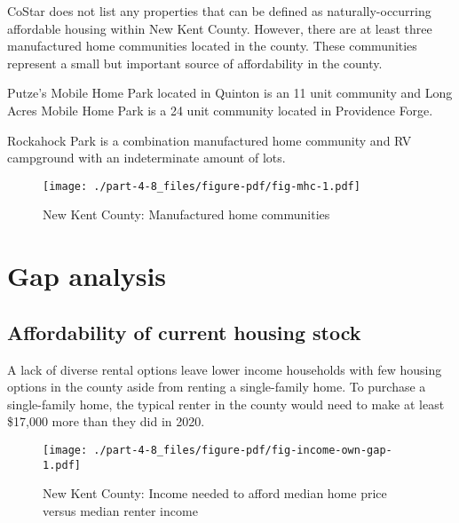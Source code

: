 \documentclass[
  letterpaper,
  DIV=11,
  numbers=noendperiod]{scrreprt}
\begin{document}
CoStar does not list any properties that can be defined as
naturally-occurring affordable housing within New Kent County. However,
there are at least three manufactured home communities located in the
county. These communities represent a small but important source of
affordability in the county.

Putze's Mobile Home Park located in Quinton is an 11 unit community and
Long Acres Mobile Home Park is a 24 unit community located in Providence
Forge.

Rockahock Park is a combination manufactured home community and RV
campground with an indeterminate amount of lots.

\begin{figure}

{\centering \texttt{[image: ./part-4-8\_files/figure-pdf/fig-mhc-1.pdf]}

}

\caption{\label{fig-mhc}New Kent County: Manufactured home communities}

\end{figure}

\hypertarget{gap-analysis-7}{%
\section{Gap analysis}\label{gap-analysis-7}}

\hypertarget{affordability-of-current-housing-stock-7}{%
\subsection{Affordability of current housing
stock}\label{affordability-of-current-housing-stock-7}}

A lack of diverse rental options leave lower income households with few
housing options in the county aside from renting a single-family home.
To purchase a single-family home, the typical renter in the county would
need to make at least \$17,000 more than they did in 2020.

\begin{figure}

{\centering \texttt{[image: ./part-4-8\_files/figure-pdf/fig-income-own-gap-1.pdf]}

}

\caption{\label{fig-income-own-gap}New Kent County: Income needed to
afford median home price versus median renter income}

\end{figure}
\end{document}
